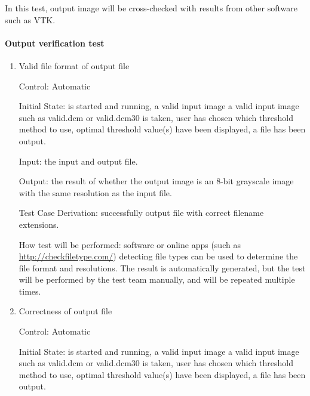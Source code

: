 \documentclass[12pt, titlepage]{article}
\begin{document}
In this test, output image will be cross-checked with results from other
software such as VTK.
		
\paragraph{Output verification test}

\begin{enumerate}

\item{Valid file format of output file}

Control: Automatic
					
Initial State: \progname{} is started and running, a valid input image a valid
input image such as valid.dcm or valid.dcm30 is taken, user has chosen which
threshold method to use, optimal threshold value(s) have been displayed, a file
has been output.
					
Input: the input and output file.
					
Output: the result of whether the output image is an 8-bit grayscale image with
the same resolution as the input file.

Test Case Derivation: successfully output file with correct filename extensions.

How test will be performed: software or online apps (such as
\url{http://checkfiletype.com/}) detecting file types can be used to determine
the file format and resolutions. The result is automatically generated, but the
test will be performed by the test team manually, and will be repeated multiple
times. 

\item{Correctness of output file}


Control: Automatic
					
Initial State: \progname{} is started and running, a valid input image a valid
input image such as valid.dcm or valid.dcm30 is taken, user has chosen which
threshold method to use, optimal threshold value(s) have been displayed, a file
has been output.
					

\end{enumerate}
\end{document}
